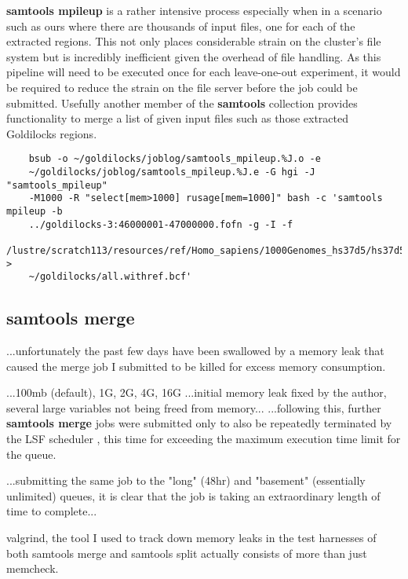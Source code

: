 \textbf{samtools mpileup} is a rather intensive process especially when in a
scenario such as ours where there are thousands of input files, one for each of
the extracted regions. This not only places considerable strain on the cluster's
file system but is incredibly inefficient given the overhead of file handling.
As this pipeline will need to be executed once for each leave-one-out
experiment, it would be required to reduce the strain on the file server before
the job could be submitted. Usefully another member of the \textbf{samtools}
collection provides functionality to merge a list of given input files such as
those extracted Goldilocks regions.

\begin{verbatim}
    bsub -o ~/goldilocks/joblog/samtools_mpileup.%J.o -e
    ~/goldilocks/joblog/samtools_mpileup.%J.e -G hgi -J "samtools_mpileup"
    -M1000 -R "select[mem>1000] rusage[mem=1000]" bash -c 'samtools mpileup -b
    ../goldilocks-3:46000001-47000000.fofn -g -I -f
    /lustre/scratch113/resources/ref/Homo_sapiens/1000Genomes_hs37d5/hs37d5.fa >
    ~/goldilocks/all.withref.bcf'
\end{verbatim}


\subsection{samtools merge}

...unfortunately the past few days have been swallowed by a memory leak that
caused the merge job I submitted to be killed for excess memory consumption.

...100mb (default), 1G, 2G, 4G, 16G
...initial memory leak fixed by the author, several large variables not being
freed from memory...
...following this, further \textbf{samtools merge} jobs were submitted only to
also be repeatedly terminated by the LSF scheduler , this time for exceeding the
maximum execution time limit for the queue.

...submitting the same job to the "long" (48hr) and "basement" (essentially
unlimited) queues, it is clear that the job is taking an extraordinary length of
time to complete...

valgrind, the tool I used to track down memory leaks in the test harnesses of
both samtools merge and samtools split actually consists of more than just
memcheck.


